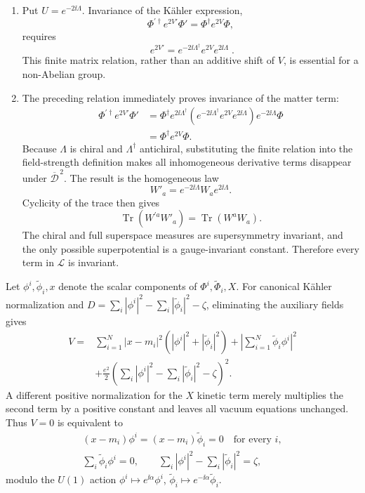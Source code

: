 \begin{enumerate}
\begin{enumerate}
    \item[(vi)] Put \(U=e^{-2\ii\Lambda}\).  Invariance of the K\"ahler
      expression,
      \[
        \Phi^{\prime\dagger}e^{2V'}\Phi'
          =\Phi^\dagger e^{2V}\Phi,
      \]
      requires
      \[
        \boxed{\;
        e^{2V'}=e^{-2\ii\Lambda^\dagger}
                  e^{2V}e^{2\ii\Lambda}\; }.
      \]
      This finite matrix relation, rather than an additive shift of \(V\),
      is essential for a non-Abelian group.

    \item[(vii)] The preceding relation immediately proves invariance of
      the matter term:
      \[
      \begin{aligned}
        \Phi^{\prime\dagger}e^{2V'}\Phi'
          &=\Phi^\dagger e^{2\ii\Lambda^\dagger}
             \left(e^{-2\ii\Lambda^\dagger}
                   e^{2V}e^{2\ii\Lambda}\right)
             e^{-2\ii\Lambda}\Phi\\
          &=\Phi^\dagger e^{2V}\Phi.
      \end{aligned}
      \]
      Because \(\Lambda\) is chiral and \(\Lambda^\dagger\) antichiral,
      substituting the finite relation into the field-strength definition
      makes all inhomogeneous derivative terms disappear under
      \(\overline{\mathcal D}^{\,2}\).  The result is the homogeneous law
      \[
        W'_a=e^{-2\ii\Lambda}W_a e^{2\ii\Lambda}.
      \]
      Cyclicity of the trace then gives
      \[
        \operatorname{Tr}(W^{\prime a}W'_a)
          =\operatorname{Tr}(W^aW_a).
      \]
      The chiral and full superspace measures are supersymmetry invariant,
      and the only possible superpotential is a gauge-invariant constant.
      Therefore every term in \(\mathcal L\) is invariant.
  \end{enumerate}

Let \(\phi^i,\widetilde\phi_i,x\) denote the scalar components of
  \(\Phi^i,\widetilde\Phi_i,X\).  For canonical K\"ahler normalization and
  \(D=\sum_i|\phi^i|^2-\sum_i|\widetilde\phi_i|^2-\zeta\), eliminating the
  auxiliary fields gives
  \[
  \begin{aligned}
    V={}&\sum_{i=1}^N|x-m_i|^2
       \left(|\phi^i|^2+|\widetilde\phi_i|^2\right)
       +\left|\sum_{i=1}^N\widetilde\phi_i\phi^i\right|^2\\
      &+\frac{e^2}{2}
       \left(\sum_i|\phi^i|^2
             -\sum_i|\widetilde\phi_i|^2-\zeta\right)^2.
  \end{aligned}
  \]
  A different positive normalization for the \(X\) kinetic term merely
  multiplies the second term by a positive constant and leaves all vacuum
  equations unchanged.  Thus \(V=0\) is equivalent to
  \[
  \begin{gathered}
    (x-m_i)\phi^i=(x-m_i)\widetilde\phi_i=0
       \quad\text{for every }i,\\
    \sum_i\widetilde\phi_i\phi^i=0,\qquad
    \sum_i|\phi^i|^2-\sum_i|\widetilde\phi_i|^2=\zeta,
  \end{gathered}
  \]
  modulo the \(U(1)\) action
  \(\phi^i\mapsto e^{\ii\alpha}\phi^i\),
  \(\widetilde\phi_i\mapsto e^{-\ii\alpha}\widetilde\phi_i\).


\end{enumerate}

